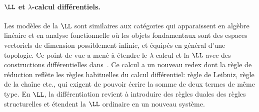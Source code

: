 \documentclass[a4]{article}
\begin{document}
\paragraph*{$\LL$ et $\lambda$-calcul différentiels.}
Les modèles de la $\LL$ sont similaires aux catégories qui
apparaissent en algèbre linéaire et en analyse fonctionnelle où les
objets fondamentaux sont des espaces vectoriels de dimension
possiblement infinie, et équipés en général d'une topologie.
%
Ce point de vue a mené à étendre le $\lambda$-calcul et la $\LL$ avec
des constructions différentielles
dans~\cite{EhrhardRegnier02,EhrhardRegnier06d}.
%
%
Ce calcul a un nouveau redex
dont la règle de réduction reflète les règles habituelles du calcul
différentiel: règle de Leibniz, règle de la chaîne etc., qui exigent
de pouvoir écrire la somme de deux termes de même type.
%
%
En $\LL$, la différentiation revient à introduire des règles duales
des règles structurelles et étendent la $\LL$ ordinaire en un nouveau
système.
\end{document}
